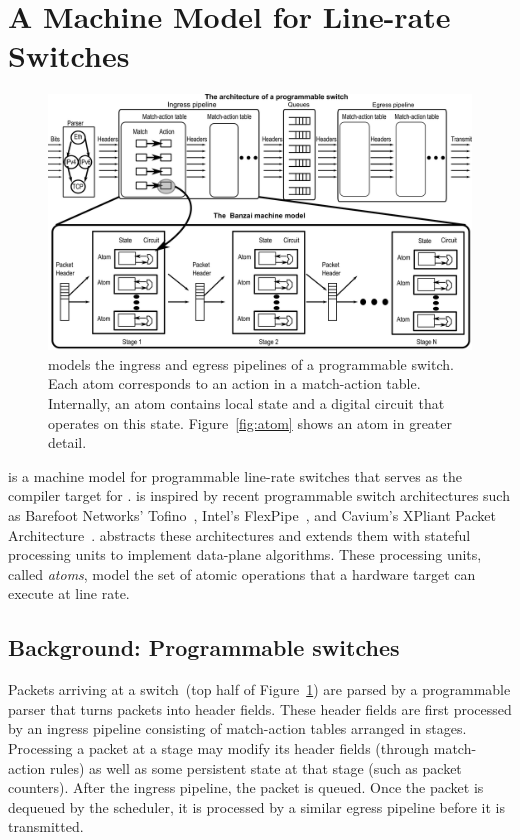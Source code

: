 \section{A Machine Model for Line-rate Switches}
\label{s:absmachine}

\begin{figure}[!t]
  \includegraphics[width=\textwidth]{banzai.pdf}
  \caption{\absmachine models the ingress and egress pipelines of a
  programmable switch. Each atom corresponds to an action in a match-action
  table. Internally, an atom contains local state and a digital circuit that
  operates on this state. Figure~\ref{fig:atom} shows an atom in greater detail.}
  \label{fig:switch}
\end{figure}

\absmachine is a machine model for programmable line-rate switches that serves
as the compiler target for \pktlanguage.  \absmachine is inspired by recent
programmable switch architectures such as Barefoot Networks' Tofino~\cite{tofino},
Intel's FlexPipe~\cite{flexpipe}, and Cavium's XPliant Packet
Architecture~\cite{xpliant}. \absmachine abstracts these architectures and
extends them with stateful processing units to implement data-plane algorithms.
These processing units, called {\em atoms}, model the set of atomic operations
that a hardware target can execute at line rate.

\subsection{Background: Programmable switches}
Packets arriving at a switch~(top half of Figure~\ref{fig:switch}) are parsed
by a programmable parser that turns packets into header fields. These header
fields are first processed by an ingress pipeline consisting of match-action
tables arranged in stages. Processing a packet at a stage may modify its header
fields (through match-action rules) as well as some persistent state at that
stage (such as packet counters). After the ingress pipeline, the packet is
queued. Once the packet is dequeued by the scheduler, it is processed by a
similar egress pipeline before it is transmitted.

